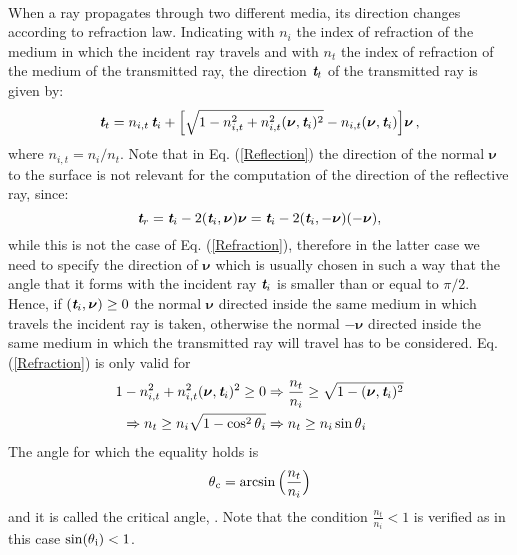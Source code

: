 \\ When a ray propagates through two different media, its direction changes according to refraction law. 
Indicating with $n_i$ the index of refraction of the medium in which the incident ray travels and with $n_t$ the index of refraction of the medium of the transmitted ray, the direction $\textit{\textbf{t}}_t$ of the transmitted ray is given by:
\begin{equation}\label{Refraction}
\textit{\textbf{t}}_t = n_{i,t}\,\textit{\textbf{t}}_i+
\Big[\sqrt{1-n_{i,t}^2+n_{i,t}^2(\boldsymbol{\nu},\textit{\textbf{t}}_i)^2}-n_{i,t}(\boldsymbol{\nu},\textit{\textbf{t}}_i) \Big]\boldsymbol{\nu}\,,
\end{equation}
where $n_{i,t}=n_i/n_t$. Note that in Eq. (\ref{Reflection}) the direction of the normal $\boldsymbol{\nu}$ to the surface is not relevant for the computation of the direction of the reflective ray, since:
\begin{equation}
\textit{\textbf{t}}_r = \textit{\textbf{t}}_i-2(\textit{\textbf{t}}_i,\boldsymbol{\nu})\boldsymbol{\nu}= \textit{\textbf{t}}_i-2(\textit{\textbf{t}}_i,-\boldsymbol{\nu})(-\boldsymbol{\nu}) ,
\end{equation}
while this is not the case of Eq. (\ref{Refraction}), therefore in the latter case we need to specify the direction of $\boldsymbol{\nu}$ which is usually chosen in such a way that the angle that it forms with the incident ray $\textit{\textbf{t}}_i$ is smaller than or equal to $\pi/2$. Hence, if $(\textit{\textbf{t}}_i, \boldsymbol{\nu})\geq0$ the normal $\boldsymbol{\nu}$ directed inside the same medium in which travels the incident ray is taken, otherwise the normal $-\boldsymbol{\nu}$ directed inside the same medium in which the transmitted ray will travel has to be considered. 
Eq. (\ref{Refraction}) is only valid for 
\begin{equation}\label{tir}\begin{split}
1-n_{i,t}^2+n_{i,t}^2(\boldsymbol{\nu},\textit{\textbf{t}}_i)^2\geq 0 & \Rightarrow \frac{n_t}{n_i}\geq \sqrt{1-(\boldsymbol{\nu},\textit{\textbf{t}}_i)^2}\\
\Rightarrow n_t\geq n_i\sqrt{1-\cos^2\mbox{$\theta$}_i} & \Rightarrow  n_t\geq n_i \sin\mbox{$\theta$}_i
\end{split}
\end{equation}
 The angle for which the equality holds is
\begin{equation}\label{critical}
\mbox{$\theta$}_{\textrm{c}} = \arcsin\Big(\frac{n_t}{n_i}\Big)
\end{equation} and it is called the critical angle, \cite{chaves2015introduction}.
Note that the condition $\frac{n_t}{n_i}<1$ is verified as in this case $\sin(\mbox{$\theta$}_\textrm{i})<1$.
